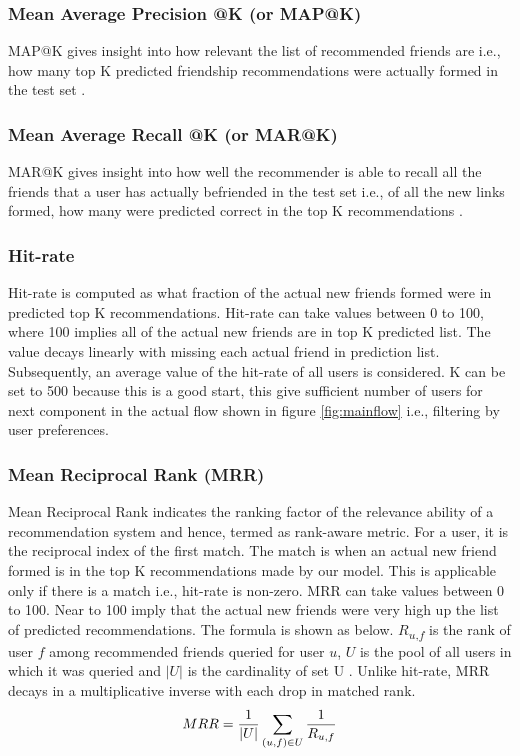 \documentclass{kththesis}
\begin{document}
\subsubsection{Mean Average Precision @K (or MAP@K)}
\noindent MAP@K gives insight into how relevant the list of recommended friends are i.e., how many top K predicted friendship recommendations were actually formed in the test set \cite{eval}.

\subsubsection{Mean Average Recall @K (or MAR@K)}
\noindent MAR@K gives insight into how well the recommender is able to recall all the friends that a user has actually befriended in the test set i.e., of all the new links formed, how many were predicted correct in the top K recommendations \cite{eval}.
    
\subsubsection{Hit-rate}
\noindent Hit-rate is computed as what fraction of the actual new friends formed were in predicted top K recommendations. Hit-rate can take values between 0 to 100, where 100 implies all of the actual new friends are in top K predicted list. The value decays linearly with missing each actual friend in prediction list. Subsequently, an average value of the hit-rate of all users is considered. K can be set to 500 because this is a good start, this give sufficient number of users for next component in the actual flow shown in figure \ref{fig:mainflow} i.e., filtering by user preferences.

\subsubsection{Mean Reciprocal Rank (MRR)}
\noindent Mean Reciprocal Rank indicates the ranking factor of the relevance ability of a recommendation system and hence, termed as rank-aware metric. For a user, it is the reciprocal index of the first match. The match is when an actual new friend formed is in the top K recommendations made by our model. This is applicable only if there is a match i.e., hit-rate is non-zero. MRR can take values between 0 to 100. Near to 100 imply that the actual new friends were very high up the list of predicted recommendations. The formula is shown as below. $R$\textsubscript{$u$,$f$} is the rank of user $f$ among recommended friends queried for user $u$, $U$ is the pool of all users in which it was queried and $|U|$ is the cardinality of set U \cite{PinSage}. Unlike hit-rate, MRR decays in a multiplicative inverse with each drop in matched rank. %
    \begin{equation}
        MRR = \frac{1}{|U|} \sum_{(u,f)\in U}^{} \frac{1}{R\textsubscript{$u$,$f$}} \\
    \end{equation}
\end{document}
